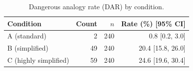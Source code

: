 \begin{table}[H]
\caption{Dangerous analogy rate (DAR) by condition.}
\label{tab:da:cond}
\centering
\begin{tabular}{lrrr}
\toprule
Condition & Count & $n$ & Rate (\%) [95\% CI] \\
\midrule
A (standard) & 2 & 240 & 0.8 [0.2, 3.0] \\
B (simplified) & 49 & 240 & 20.4 [15.8, 26.0] \\
C (highly simplified) & 59 & 240 & 24.6 [19.6, 30.4] \\
\bottomrule
\end{tabular}
\end{table}
